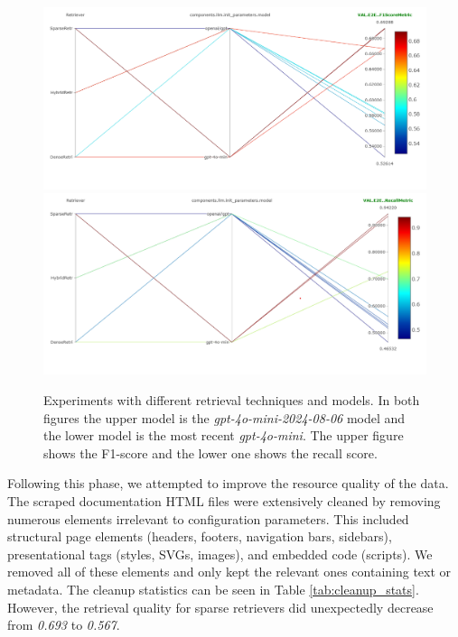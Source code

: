 \begin{figure}[!ht]
    \centering
    \includegraphics[width=\textwidth]{images/RetrievalTypes-vs-LLM-f1.png}\\[6pt]
    \includegraphics[width=\textwidth]{images/RetrievalTypes-vs-LLM-Recall.png}
    \caption{Experiments with different retrieval techniques and models. In both figures the upper model is the \textit{gpt-4o-mini-2024-08-06} model and the lower model is the most recent \textit{gpt-4o-mini}. The upper figure shows the F1-score and the lower one shows the recall score.}
    \label{fig:conf-phase-0-retrievers}
\end{figure}

Following this phase, we attempted to improve the resource quality of the data. The scraped documentation HTML files were extensively cleaned by removing numerous elements irrelevant to configuration parameters. This included structural page elements (headers, footers, navigation bars, sidebars), presentational tags (styles, SVGs, images), and embedded code (scripts). We removed all of these elements and only kept the relevant ones containing text or metadata. The cleanup statistics can be seen in Table \ref{tab:cleanup_stats}. However, the retrieval quality for sparse retrievers did unexpectedly decrease from \textit{0.693} to \textit{0.567}. 

